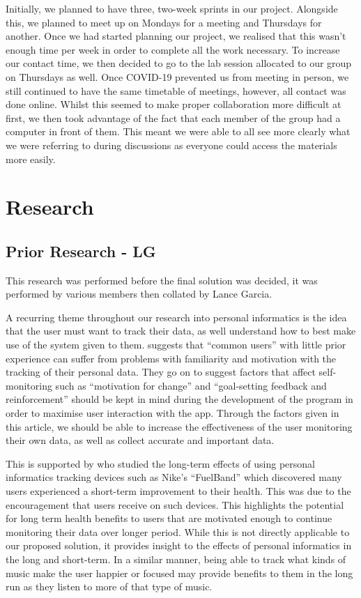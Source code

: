 \documentclass[11pt]{report}
\begin{document}
Initially, we planned to have three, two-week sprints in our project. Alongside this, we planned to meet up on Mondays for a meeting and Thursdays for another. Once we had started planning our project, we realised that this wasn’t enough time per week in order to complete all the work necessary. To increase our contact time, we then decided to go to the lab session allocated to our group on Thursdays as well. Once COVID-19 prevented us from meeting in person, we still continued to have the same timetable of meetings, however, all contact was done online. Whilst this seemed to make proper collaboration more difficult at first, we then took advantage of the fact that each member of the group had a computer in front of them. This meant we were able to all see more clearly what we were referring to during discussions as everyone could access the materials more easily.



\chapter{Research}


\section{Prior Research - LG}

This research was performed before the final solution was decided, it was performed by various members then collated by Lance Garcia.\newline

A recurring theme throughout our research into personal informatics is the idea that the user must want to track their data, as well understand how to best make use of the system given to them. \cite{Rapp2014a} suggests that “common users” with little prior experience can suffer from problems with familiarity and motivation with the tracking of their personal data. They go on to suggest factors that affect self-monitoring such as “motivation for change” and “goal-setting feedback and reinforcement” should be kept in mind during the development of the program in order to maximise user interaction with the app. Through the factors given in this article, we should be able to increase the effectiveness of the user monitoring their own data, as well as collect accurate and important data.

This is supported by \cite{Fritz2014} who studied the long-term effects of using personal informatics tracking devices such as Nike’s “FuelBand” which discovered many users experienced a short-term improvement to their health. This was due to the encouragement that users receive on such devices. This highlights the potential for long term health benefits to users that are motivated enough to continue monitoring their data over longer period. While this is not directly applicable to our proposed solution, it provides insight to the effects of personal informatics in the long and short-term. In a similar manner, being able to track what kinds of music make the user happier or focused may provide benefits to them in the long run as they listen to more of that type of music.
\end{document}
